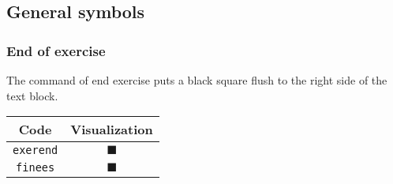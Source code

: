 \documentclass[11pt,a4paper,openany]{book}
\newcommand*{\cs}[1]{\texttt{\char92#1}}
\begin{document}
\subsection{General symbols}

\subsubsection{End of exercise}
The command of end exercise puts a black square flush to the right side of the text block.
\begin{center}
\begin{tabular}{cc}
\toprule
Code & Visualization\\
\midrule
\cs{exerend} & $\blacksquare$\\
\cs{finees} & $\blacksquare$\\
\bottomrule
\end{tabular}
\end{center}
\end{document}
